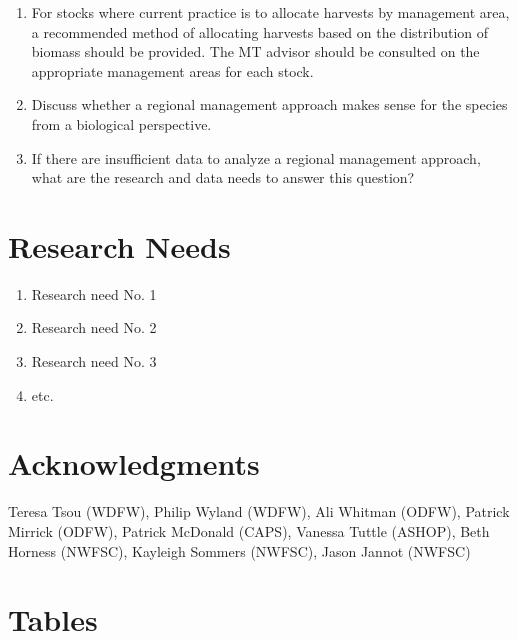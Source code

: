\documentclass[12pt,]{article}
\providecommand{\tightlist}{%
  \setlength{\itemsep}{0pt}\setlength{\parskip}{0pt}}
\begin{document}
\begin{enumerate}
\def\labelenumi{\arabic{enumi}.}
\tightlist
\item
  For stocks where current practice is to allocate harvests by
  management area, a recommended method of allocating harvests based on
  the distribution of biomass should be provided. The MT advisor should
  be consulted on the appropriate management areas for each stock.
\item
  Discuss whether a regional management approach makes sense for the
  species from a biological perspective.
\item
  If there are insufficient data to analyze a regional management
  approach, what are the research and data needs to answer this
  question?
\end{enumerate}

\section{Research Needs}\label{research-needs}

\begin{enumerate}

\item Research need No. 1

\item Research need No. 2

\item Research need No. 3

\item etc.

\end{enumerate}

\section{Acknowledgments}\label{acknowledgments}

Teresa Tsou (WDFW), Philip Wyland (WDFW), Ali Whitman (ODFW), Patrick
Mirrick (ODFW), Patrick McDonald (CAPS), Vanessa Tuttle (ASHOP), Beth
Horness (NWFSC), Kayleigh Sommers (NWFSC), Jason Jannot (NWFSC)

\newpage

\FloatBarrier

\section{Tables}\label{tables}
\end{document}
